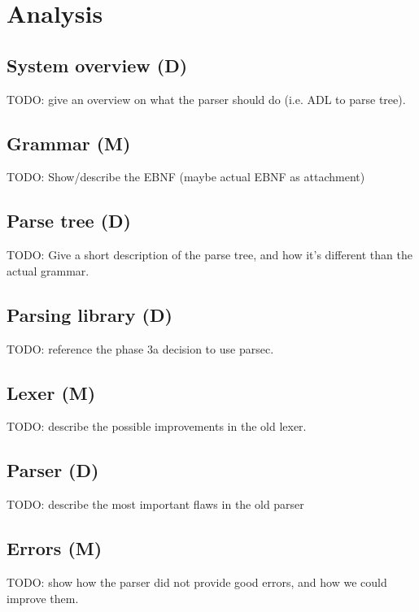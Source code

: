 
\section{Analysis}
\label{sec:analysis}

\subsection{System overview (D)}
TODO: give an overview on what the parser should do (i.e. ADL to parse tree).

\subsection{Grammar (M)}
TODO: Show/describe the EBNF (maybe actual EBNF as attachment)

\subsection{Parse tree (D)}
TODO: Give a short description of the parse tree, and how it's different than the actual grammar.

\subsection{Parsing library (D)}
TODO: reference the phase 3a decision to use parsec.

\subsection{Lexer (M)}
TODO: describe the possible improvements in the old lexer.

\subsection{Parser (D)}
TODO: describe the most important flaws in the old parser

\subsection{Errors (M)}
TODO: show how the parser did not provide good errors, and how we could improve them.
